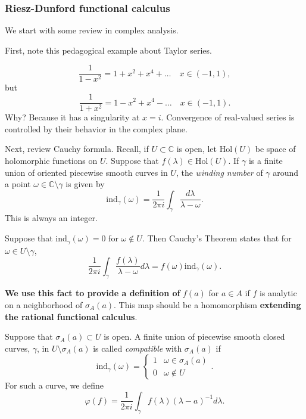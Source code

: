 
\subsubsection{Riesz-Dunford functional calculus}


We start with some review in complex analysis.

First, note this pedagogical example about Taylor series.
\begin{example}
	\[
		\frac{1}{1 - x^2} = 1 + x^2 + x^4 + \ldots  \quad x \in (-1, 1)
	,\] 
	but
	\[
		\frac{1}{1 + x^2} = 1 - x^2 + x^4 - \ldots \quad x \in (-1, 1)
	.\] 
	Why? Because it has a singularity at $x = i$. Convergence of real-valued series is controlled by their behavior in the complex plane.
\end{example}

Next, review Cauchy formula.
Recall, if $U \subset \mathbb{C}$ is open, let $\text{Hol}(U)$ be space of holomorphic functions on $U$. Suppose that $f(\lambda) \in \text{Hol}(U)$. If $\gamma$ is a finite union of oriented piecewise smooth curves in $U$, the \textit{winding number} of $\gamma$ around a point $\omega \in \mathbb{C} \setminus \gamma$ is given by
\[
	\text{ind}_\gamma(\omega) = \frac{1}{2 \pi i} \int _\gamma \frac{d \lambda}{\lambda - \omega}
.\] 
This is always an integer. 

Suppose that $\text{ind}_\gamma(\omega) = 0$ for $\omega \not\in  U$. Then Cauchy's Theorem states that for $\omega \in U \setminus \gamma$, 
\[
	\frac{1}{2 \pi i} \int _\gamma \frac{f(\lambda)}{\lambda - \omega} d \lambda = f(\omega) \text{ind}_\gamma (\omega)
.\] 

\textbf{We use this fact to provide a definition of} $f(a)$ for $a \in A$ if $f$ is analytic on a neighborhood of $\sigma_A(a)$. This map should be a homomorphism \textbf{extending the rational functional calculus}.

Suppose that $\sigma_A(a) \subset U$ is open. A finite union of piecewise smooth closed curves, $\gamma$, in $U \setminus \sigma_A(a)$ is called \textit{compatible} with $\sigma_A(a)$ if
\[
	\text{ind}_\gamma(\omega) = \begin{cases}
		1 & \omega \in \sigma_A(a) \\
		0 & \omega \not\in U
	\end{cases}
.\] 
For such a curve, we define
\[
	\varphi(f) = \frac{1}{2 \pi i} \int _\gamma f(\lambda) (\lambda - a)^{- 1} d \lambda
.\] 

